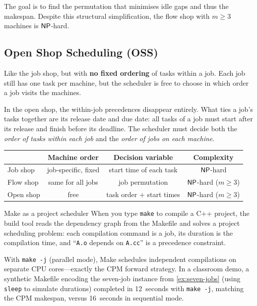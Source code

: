 \noindent
The goal is to find the permutation that minimises idle gaps and
thus the makespan.  Despite this structural simplification, the
flow shop with $m \ge 3$ machines is $\mathsf{NP}$-hard.

\subsection{Open Shop Scheduling (OSS)}
\label{ssec:open-shop}

\begin{definition}
\label{def:open-shop}
Like the job shop, but with \textbf{no fixed ordering} of tasks
within a job.  Each job still has one task per machine, but the
scheduler is free to choose in which order a job visits the
machines.
\end{definition}

In the open shop, the within-job precedences disappear entirely.
What ties a job's tasks together are its release date and due
date: all tasks of a job must start after its release and finish
before its deadline.  The scheduler must decide both the
\emph{order of tasks within each job} and the \emph{order of
jobs on each machine}.

\medskip
\begin{center}
\begin{tabular}{lccc}
\toprule
 & \textbf{Machine order} & \textbf{Decision variable}
 & \textbf{Complexity} \\
\midrule
Job shop  & job-specific, fixed
          & start time of each task
          & $\mathsf{NP}$-hard \\
Flow shop & same for all jobs
          & job permutation
          & $\mathsf{NP}$-hard ($m \ge 3$) \\
Open shop & free
          & task order + start times
          & $\mathsf{NP}$-hard ($m \ge 3$) \\
\bottomrule
\end{tabular}
\end{center}

\begin{intermezzo}{Make as a project scheduler}
When you type \texttt{make} to compile a C++ project, the build
tool reads the dependency graph from the Makefile and solves a
project scheduling problem: each compilation command is a job,
its duration is the compilation time, and ``\texttt{A.o} depends
on \texttt{A.cc}'' is a precedence constraint.

With \texttt{make -j} (parallel mode), Make schedules independent
compilations on separate CPU cores---exactly the CPM forward
strategy.  In a classroom demo, a synthetic Makefile encoding the
seven-job instance from \cref{ex:seven-jobs} (using \texttt{sleep}
to simulate durations) completed in 12~seconds with
\texttt{make -j}, matching the CPM makespan, versus 16~seconds
in sequential mode.
\end{intermezzo}

